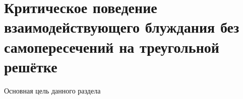 \section{Критическое поведение взаимодействующего блуждания без самопересечений на треугольной решётке}

Основная цель данного раздела